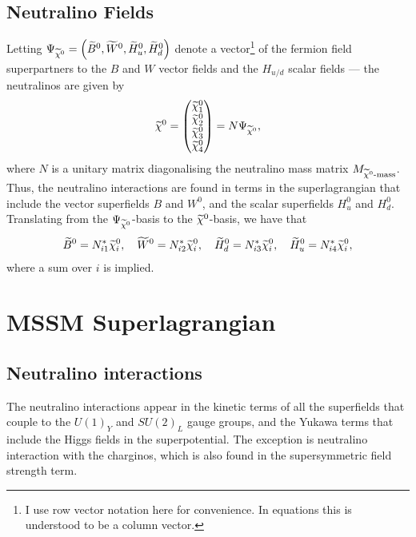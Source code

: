 \documentclass[english, notitlepage]{article}
\begin{document}
    \subsection{Neutralino Fields}
        Letting $\Psi_{\nino} = \pclosed{\bino, \wino, \hinou, \hinod}$ denote a
        vector\footnote{I use row vector notation here for convenience. In equations
            this is understood to be a column vector.} of the fermion field superpartners
        to the $B$ and $W$ vector fields and the $H_{u/d}$ scalar fields --- the
        neutralinos are given by
        \begin{align}
            \nino = \begin{pmatrix}
                        \nino[1] \\ \nino[2] \\ \nino[3] \\ \nino[4]
                    \end{pmatrix} = N \Psi_{\nino},
        \end{align}
        where $N$ is a unitary matrix diagonalising the neutralino mass matrix $M_{\nino\text{-mass}}$. Thus, the neutralino interactions are found in terms in the superlagrangian that include the vector superfields $B$ and $W^0$, and the scalar superfields $H_u^0$ and $H_d^0$. Translating from the $\Psi_{\nino}$-basis to the $\nino$-basis, we have that
        \begin{align}
            \bino = N_{i1}^* \nino[i],\quad \wino = N_{i2}^* \nino[i],\quad \hinod = N_{i3}^* \nino[i],\quad \hinou = N_{i4}^* \nino[i],
        \end{align}
        where a sum over $i$ is implied.

\section{MSSM Superlagrangian}

    \subsection{Neutralino interactions}
        The neutralino interactions appear in the kinetic terms of all the superfields
        that couple to the $U(1)_Y$ and $SU(2)_L$ gauge groups, and the Yukawa terms
        that include the Higgs fields in the superpotential. The exception is neutralino interaction with the charginos, which is also found in the supersymmetric field strength term.
\end{document}
